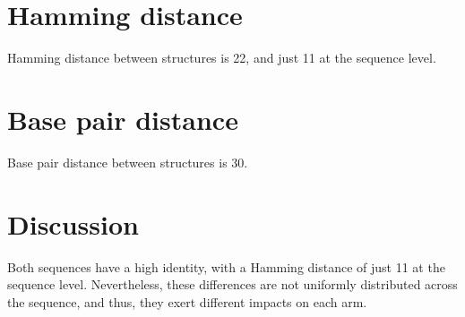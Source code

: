 \documentclass[10pt,a4paper]{article}
\begin{document}

\section{Hamming distance}

Hamming distance between structures is 22, and just 11 at the sequence level.


\section{Base pair distance}

Base pair distance between structures is 30.

\section{Discussion}

Both sequences have a high identity, with a Hamming distance of just 11 at the sequence level. Nevertheless, these differences are not uniformly distributed across the sequence, and thus, they exert different impacts on each arm.
\end{document}
